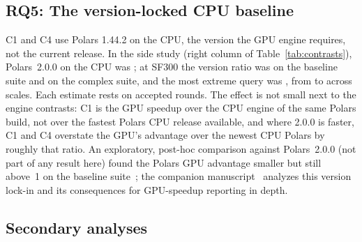 \documentclass[sigconf, nonacm]{acmart}
\begin{document}
\subsection{RQ5: The version-locked CPU baseline}
\label{sec:rq5}

C1 and C4 use Polars 1.44.2 on the CPU, the version the GPU engine requires,
not the current release. In the side study (right column of
Table~\ref{tab:contrasts}), Polars~2.0.0 on the CPU was
; at SF300 the version ratio was
 on the baseline suite and
 on the complex suite, and the most extreme
query was , from
 to
 across scales. Each estimate rests on
 accepted rounds. The effect is not
small next to the engine contrasts: C1 is the GPU speedup over the CPU engine
of the same Polars build, not over the fastest Polars CPU release available,
and where 2.0.0 is faster, C1 and C4 overstate the GPU's advantage over the
newest CPU Polars by roughly that ratio. An exploratory, post-hoc comparison
against Polars~2.0.0 (not part of any result here) found the Polars GPU
advantage smaller but still above~1
 on the baseline
suite~\citep{ejiofor2026extended}; the companion
manuscript~\citep{ejiofor2026lockin} analyzes this version lock-in and its
consequences for GPU-speedup reporting in depth.

\subsection{Secondary analyses}
\label{sec:secondary}
\end{document}
